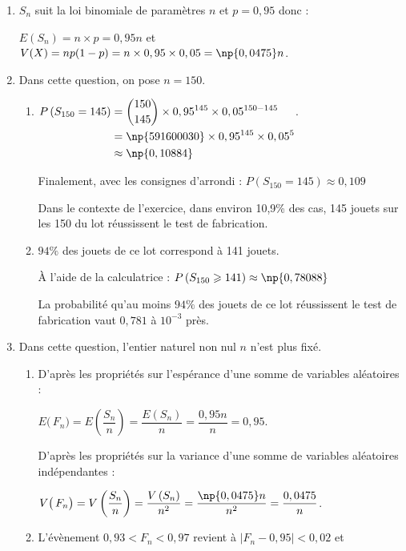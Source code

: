 \begin{enumerate}
	\item $S_{n}$ suit la loi binomiale de paramètres $n$ et $p = 0,95$ donc :

$E\left(S_n\right)=n\times p = 0,95n$ \quad et \quad $V(X)=np(1-p)= n \times 0,95 \times 0,05 = \np{0,0475}n$.

	\item Dans cette question, on pose $n = 150$.
	\begin{enumerate}
		\item
		$\begin{aligned}[t] P\left(S_{150}=145\right)
			& = \displaystyle \binom{150}{145}\times 0,95^{145}\times 0,05^{150 - 145}\\
			& = \np{591600030}\times 0,95^{145} \times 0,05^{5}\\
			& \approx \np{0,10884}
		\end{aligned}$.

Finalement, avec les consignes d'arrondi : \quad $P\left(S_{150}= 145\right) \approx 0,109$

Dans le contexte de l'exercice, dans environ 10,9\% des cas, 145 jouets sur les 150 du lot réussissent le test de fabrication.
		\item $94\%$ des jouets de ce lot  correspond à 141 jouets.

À l'aide de la calculatrice : $P\left(S_{150} \geqslant 141\right) \approx \np{0,78088}$

		La probabilité qu'au moins $94\%$ des jouets de ce lot réussissent le test de fabrication vaut $0,781$ à $10^{-3}$ près.
	\end{enumerate}

	\item Dans cette question, l'entier naturel non nul $n$ n'est plus fixé.

	\begin{enumerate}
		\item D'après les propriétés sur l'espérance d'une somme de variables aléatoires :

$E\big(\,F_{n}\big)= E\left(\dfrac{S_{n}}{n}\right) = \dfrac{E\left( S_{n}\right)}{n}= \dfrac{0,95n}{n}= 0,95 $.

D'après les propriétés sur la variance d'une somme de variables aléatoires indépendantes :

$V\big(\,F_{n}\big)= V\left(\dfrac{S_{n}}{n}\right) = \dfrac{V\left( S_{n}\right)}{n^2}= \dfrac{\np{0,0475}n}{n^2}= \dfrac{0,0475}{n}$.

	\item L'évènement \og $0,93 <F_{n}< 0,97$ \fg{} revient à $\big|F_{n} - 0,95 \big| < 0,02$ et


\end{enumerate}
\end{enumerate}

